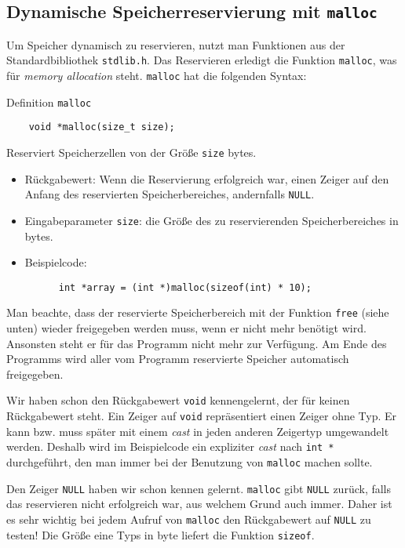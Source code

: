 \subsection{Dynamische Speicherreservierung mit \texttt{malloc}}

Um Speicher dynamisch zu reservieren, nutzt man Funktionen aus der Standardbibliothek \verb|stdlib.h|.
Das Reservieren erledigt die Funktion \verb|malloc|, was für \emph{memory allocation} steht.
\verb|malloc| hat die folgenden Syntax:
\begin{myexampleblock}{Definition \texttt{malloc}}
  \begin{lstlisting}
    void *malloc(size_t size);
  \end{lstlisting}
  Reserviert Speicherzellen von der Größe \verb|size| bytes.
  \begin{itemize} 
    \itemsep0.2pt
  \item Rückgabewert: Wenn die Reservierung erfolgreich war, einen Zeiger auf den Anfang des
    reservierten Speicherbereiches, andernfalls \verb|NULL|.
  \item Eingabeparameter \verb|size|: die Größe des zu reservierenden Speicherbereiches in bytes.
  \item Beispielcode:
    \begin{lstlisting}
      int *array = (int *)malloc(sizeof(int) * 10);
    \end{lstlisting}
  \end{itemize}
  Man beachte, dass der reservierte Speicherbereich mit der Funktion \verb|free| (siehe unten) wieder freigegeben werden muss, wenn er nicht mehr benötigt wird. 
  Ansonsten steht er für das Programm nicht mehr zur Verfügung.
  Am Ende des Programms wird aller vom Programm reservierte Speicher automatisch freigegeben.
\end{myexampleblock}
Wir haben schon den Rückgabewert \verb|void| kennengelernt, der für keinen Rückgabewert steht.
Ein Zeiger auf \verb|void| repräsentiert einen Zeiger ohne Typ.
Er kann bzw. muss später mit einem \emph{cast} in jeden anderen Zeigertyp umgewandelt werden.
Deshalb wird im Beispielcode ein expliziter \emph{cast} nach \verb|int *| durchgeführt, den man immer bei der Benutzung von \verb|malloc| machen sollte.

Den Zeiger \verb|NULL| haben wir schon kennen gelernt. 
\verb|malloc| gibt \verb|NULL| zurück, falls das reservieren nicht erfolgreich war, aus welchem Grund auch immer.
Daher ist es sehr wichtig bei jedem Aufruf von \verb|malloc| den Rückgabewert auf \verb|NULL| zu testen!
Die Größe eine Typs in byte liefert die Funktion \verb|sizeof|.

